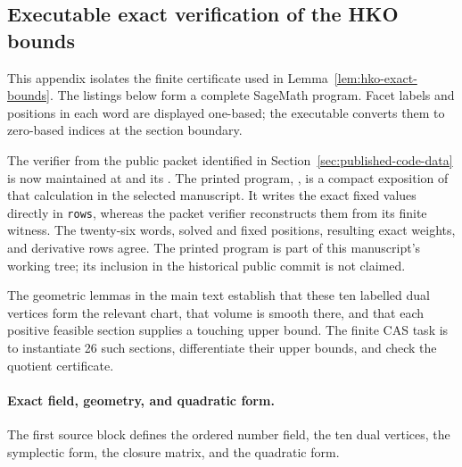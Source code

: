 \subsection{Executable exact verification of the HKO bounds}
\label{app:hko-cas}

This appendix isolates the finite certificate used in
Lemma~\ref{lem:hko-exact-bounds}. The listings below form a complete
SageMath program. Facet labels and positions in each word are
displayed one-based; the executable converts them to zero-based indices at
the section boundary.

\begin{sloppypar}
The verifier from the public packet identified in Section~\ref{sec:published-code-data}
is now maintained at
 and its
. The printed program,
, is a compact exposition of that
calculation in the selected manuscript. It writes the exact fixed values
directly in \texttt{rows}, whereas the packet verifier reconstructs them
from its finite witness. The twenty-six words, solved and fixed positions,
resulting exact weights, and derivative rows agree. The printed program
is part of this manuscript's working tree; its inclusion in the historical
public commit is not claimed.

\end{sloppypar}

The geometric lemmas in the main text establish that these ten labelled dual
vertices form the relevant chart, that volume is smooth there, and that each
positive feasible section supplies a touching upper bound.  The finite CAS
task is to instantiate 26 such sections, differentiate their upper bounds,
and check the quotient certificate.

\paragraph{Exact field, geometry, and quadratic form.}
The first source block defines the ordered number field, the ten dual
vertices, the symplectic form, the closure matrix, and the quadratic form.



